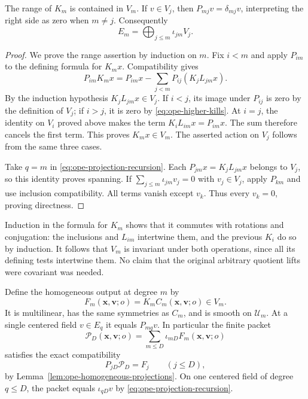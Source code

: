\begin{lemma}\label{lem:ope-homogeneous-projections}
The range of $K_m$ is contained in $V_m$. If $v\in V_j$, then
$P_{mj}v=\delta_{mj}v$, interpreting the right side as zero when
$m\neq j$. Consequently
\[
 E_m=\bigoplus_{j\leq m}\iota_{jm}V_j.
\]
\end{lemma}
\begin{proof}
We prove the range assertion by induction on $m$. Fix $i<m$ and apply
$P_{im}$ to the defining formula for $K_mx$. Compatibility gives
\[
 P_{im}K_mx=P_{im}x-\sum_{j<m}P_{ij}(K_jL_{jm}x).
\]
By the induction hypothesis $K_jL_{jm}x\in V_j$. If $i<j$, its image
under $P_{ij}$ is zero by the definition of $V_j$; if $i>j$, it is zero
by \eqref{eq:ope-higher-kills}. At $i=j$, the identity on $V_i$
proved above makes the term $K_iL_{im}x=P_{im}x$. The sum therefore
cancels the first term. This proves $K_mx\in V_m$.
The asserted action on $V_j$ follows from the same three cases.

Take $q=m$ in \eqref{eq:ope-projection-recursion}. Each
$P_{jm}x=K_jL_{jm}x$ belongs to $V_j$, so this identity proves spanning.
If $\sum_{j\leq m}\iota_{jm}v_j=0$ with $v_j\in V_j$, apply
$P_{km}$ and use inclusion compatibility. All terms vanish except
$v_k$. Thus every $v_k=0$, proving directness.
\end{proof}

Induction in the formula for $K_m$ shows that it commutes with rotations
and conjugation: the inclusions and $L_{im}$ intertwine them, and the
previous $K_i$ do so by induction. It follows that $V_m$ is invariant
under both operations, since all its defining tests intertwine them.
No claim that the original arbitrary quotient lifts were covariant was
needed.

Define the homogeneous output at degree $m$ by
\[
 F_m(\boldsymbol x,\boldsymbol v;o)
                         =K_mC_m(\boldsymbol x,\boldsymbol v;o)\in V_m.
\]
It is multilinear, has the same symmetries as $C_m$, and is smooth on
$\mathcal U_m$. At a single centered field $v\in E_q$ it equals
$P_{mq}v$. In particular the finite packet
\[
 \mathcal P_D(\boldsymbol x,\boldsymbol v;o)
          =\sum_{m\leq D}\iota_{mD}F_m(\boldsymbol x,\boldsymbol v;o)
\]
satisfies the exact compatibility
\begin{equation}\label{eq:ope-packet-projection}
 P_{jD}\mathcal P_D=F_j\qquad(j\leq D),
\end{equation}
by Lemma~\ref{lem:ope-homogeneous-projections}. On one centered field of
degree $q\leq D$, the packet equals $\iota_{qD}v$ by
\eqref{eq:ope-projection-recursion}.

